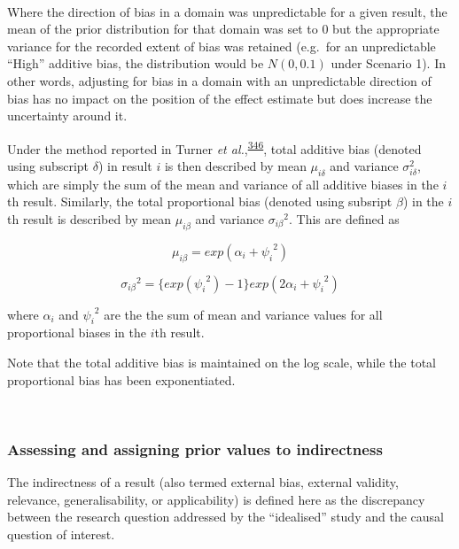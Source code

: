 \documentclass[a4paper, twoside]{templates/ociamthesis}
\begin{document}
~

Where the direction of bias in a domain was unpredictable for a given result, the mean of the prior distribution for that domain was set to 0 but the appropriate variance for the recorded extent of bias was retained (e.g.~for an unpredictable ``High'' additive bias, the distribution would be \(N(0,0.1)\) under Scenario 1). In other words, adjusting for bias in a domain with an unpredictable direction of bias has no impact on the position of the effect estimate but does increase the uncertainty around it.

Under the method reported in Turner \emph{et al.},\textsuperscript{\protect\hyperlink{ref-turner2009}{346}}, total additive bias (denoted using subscript \(\delta\)) in result \(i\) is then described by mean \(\mu_{i\delta}\) and variance \(\sigma_{i\delta}^{2}\), which are simply the sum of the mean and variance of all additive biases in the \(i\)th result. Similarly, the total proportional bias (denoted using subsript \(\beta\)) in the \(i\)th result is described by mean \(\mu_{i\beta}\) and variance \({\sigma_{i\beta}}^2\). This are defined as

\begin{equation}
  \mu_{i\beta} = exp(\alpha_{i} + {\psi_i}^2)
  \label{eq:prop-total-mean}
\end{equation}

\begin{equation}
  {\sigma_{i\beta}}^2 = \big\{ exp({\psi_{i}}^2)-1 \big\} exp({2}{\alpha_{i}} + {\psi_{i}}^2)
  \label{eq:prop-total-var}
\end{equation}

where \(\alpha_i\) and \({\psi_i}^2\) are the the sum of mean and variance values for all proportional biases in the \(i\)th result.

Note that the total additive bias is maintained on the log scale, while the total proportional bias has been exponentiated.

~

\hypertarget{assessing-and-assigning-prior-values-to-indirectness}{%
\subsubsection{Assessing and assigning prior values to indirectness}\label{assessing-and-assigning-prior-values-to-indirectness}}

The indirectness of a result (also termed external bias, external validity, relevance, generalisability, or applicability) is defined here as the discrepancy between the research question addressed by the ``idealised'' study and the causal question of interest.
\end{document}
